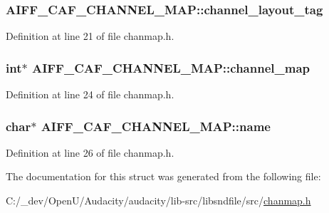 \subsubsection[{\texorpdfstring{channel\+\_\+layout\+\_\+tag}{channel_layout_tag}}]{ A\+I\+F\+F\+\_\+\+C\+A\+F\+\_\+\+C\+H\+A\+N\+N\+E\+L\+\_\+\+M\+A\+P\+::channel\+\_\+layout\+\_\+tag}\hypertarget{struct_a_i_f_f___c_a_f___c_h_a_n_n_e_l___m_a_p_a3976dbc88edbc362faaf5fec55f0ddd9}{}\label{struct_a_i_f_f___c_a_f___c_h_a_n_n_e_l___m_a_p_a3976dbc88edbc362faaf5fec55f0ddd9}


Definition at line 21 of file chanmap.\+h.

\subsubsection[{\texorpdfstring{channel\+\_\+map}{channel_map}}]{ {\bf int}$\ast$ A\+I\+F\+F\+\_\+\+C\+A\+F\+\_\+\+C\+H\+A\+N\+N\+E\+L\+\_\+\+M\+A\+P\+::channel\+\_\+map}\hypertarget{struct_a_i_f_f___c_a_f___c_h_a_n_n_e_l___m_a_p_ad4b36db2fe99cc028d6d3e3f2dc1d04c}{}\label{struct_a_i_f_f___c_a_f___c_h_a_n_n_e_l___m_a_p_ad4b36db2fe99cc028d6d3e3f2dc1d04c}


Definition at line 24 of file chanmap.\+h.

\subsubsection[{\texorpdfstring{name}{name}}]{ char$\ast$ A\+I\+F\+F\+\_\+\+C\+A\+F\+\_\+\+C\+H\+A\+N\+N\+E\+L\+\_\+\+M\+A\+P\+::name}\hypertarget{struct_a_i_f_f___c_a_f___c_h_a_n_n_e_l___m_a_p_aa459de05ddd640ed5b78c1237b15b443}{}\label{struct_a_i_f_f___c_a_f___c_h_a_n_n_e_l___m_a_p_aa459de05ddd640ed5b78c1237b15b443}


Definition at line 26 of file chanmap.\+h.



The documentation for this struct was generated from the following file\+:\begin{DoxyCompactItemize}
\item 
C\+:/\+\_\+dev/\+Open\+U/\+Audacity/audacity/lib-\/src/libsndfile/src/\hyperlink{chanmap_8h}{chanmap.\+h}\end{DoxyCompactItemize}
